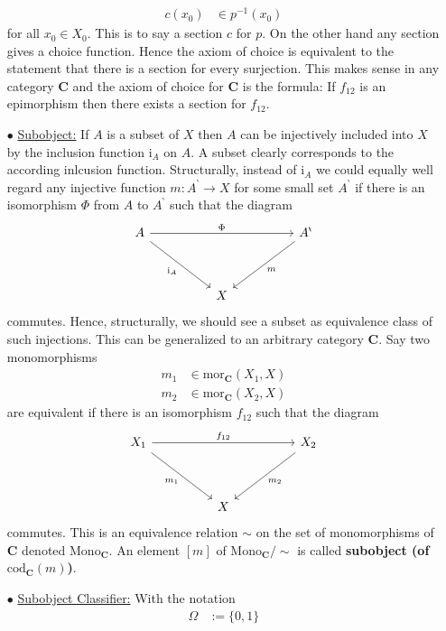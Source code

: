 \begin{exa}
\begin{enumerate}
\begin{align*}
  c(x_{0})
  &\in
  p^{-1}(x_{0})
\end{align*}
for all $x_{0} \in X_{0}$. This is to say a section $c$ for $p$. On the other hand any section gives a choice function. Hence the axiom of choice is equivalent to the statement that there is a section for every surjection. This makes sense in any category $\mathbf{C}$ and the axiom of choice for $\mathbf{C}$ is the formula: If $f_{12}$ is an epimorphism then there exists a section for $f_{12}$.
\item[$\bullet$]
\underline{Subobject:}
If $A$ is a subset of $X$ then $A$ can be injectively included into $X$ by the inclusion function $\mathrm{i}_{A}$ on $A$. A subset clearly corresponds to the according inlcusion function. Structurally, instead of $\mathrm{i}_{A}$ we could equally well regard any injective function $m \colon A^{\backprime} \rightarrow X$ for some small set $A^{\backprime}$ if there is an isomorphism $\Phi$ from $A$ to $A^{\backprime}$ such that the diagram
\[
\begin{tikzcd}[sep=huge]
  A
  \arrow{rr}{\Phi}
  \arrow[swap]{rd}{\mathrm{i}_{A}}
  &
  &
  A^{\backprime}
  \arrow{dl}{m}
  \\
  &
  X
\end{tikzcd}
\]
commutes. Hence, structurally, we should see a subset as equivalence class of such injections. This can be generalized to an arbitrary category $\mathbf{C}$. Say two monomorphisms
\begin{align*}
  m_{1}
  &\in
  \mathrm{mor}_{\mathbf{C}}(X_{1},X)
  \\
  m_{2}
  &\in
  \mathrm{mor}_{\mathbf{C}}(X_{2},X)
\end{align*}
are equivalent if there is an isomorphism $f_{12}$ such that the diagram
\[
\begin{tikzcd}[sep=huge]
  X_{1}
  \arrow{rr}{f_{12}}
  \arrow[swap]{rd}{m_{1}}
  &
  &
  X_{2}
  \arrow{dl}{m_{2}}
  \\
  &
  X
\end{tikzcd}
\]
commutes. This is an equivalence relation $\sim$ on the set of monomorphisms of $\mathbf{C}$ denoted $\mathrm{Mono}_{\mathbf{C}}$. An element $[m]$ of $\mathrm{Mono}_{\mathbf{C}} \slash \sim$ is called \textbf{subobject (of $\mathrm{cod}_{\mathbf{C}}(m)$)}.
\item[$\bullet$]
\underline{Subobject Classifier:}
With the notation
\begin{align*}
  \Omega
  &:=
  \lbrace
    0,
    1
  \rbrace
\end{align*}

\end{enumerate}
\end{exa}
